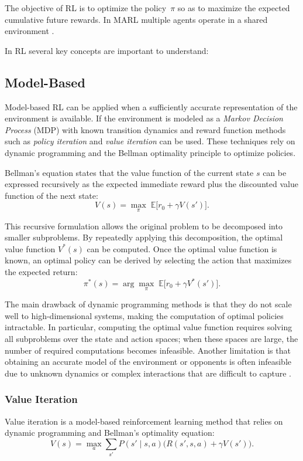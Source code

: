 The objective of RL is to optimize the policy~$\pi$ so as to maximize the expected cumulative future rewards. In MARL multiple agents operate in a shared environment \cite{brunton2022data}.

In RL several key concepts are important to understand: 

\subsection{Model-Based}
Model-based RL can be applied when a sufficiently accurate representation of the environment is available. If the environment is modeled as a \emph{Markov Decision Process} (MDP) with known transition dynamics and reward function methods such as \emph{policy iteration} and \emph{value iteration} can be used. These techniques rely on dynamic programming and the Bellman optimality principle to optimize policies.

Bellman’s equation states that the value function of the current state \(s\) can be expressed recursively as the expected immediate reward plus the discounted value function of the next state:
\[
V(s) = \max_{\pi} \; \mathbb{E}\big[ r_0 + \gamma V(s')]. 
\]

This recursive formulation allows the original problem to be decomposed into smaller subproblems. By repeatedly applying this decomposition, the optimal value function \(V^*(s)\) can be computed. Once the optimal value function is known, an optimal policy can be derived by selecting the action that maximizes the expected return:
\[
\pi^*(s) = \arg\max_{\pi} \; \mathbb{E}\big[ r_0 + \gamma V^*(s') \big].
\]

The main drawback of dynamic programming methods is that they do not scale well to high-dimensional systems, making the computation of optimal policies intractable. In particular, computing the optimal value function requires solving all subproblems over the state and action spaces; when these spaces are large, the number of required computations becomes infeasible. Another limitation is that obtaining an accurate model of the environment or opponents is often infeasible due to unknown dynamics or complex interactions that are difficult to capture \cite{brunton2022data}.

\subsubsection{Value Iteration}
Value iteration is a model-based reinforcement learning method that relies on dynamic programming and Bellman’s optimality equation:
\[
V(s) = \max_{a} \sum_{s'} P(s' \mid s, a)\big( R(s', s, a) + \gamma V(s') \big).
\]

